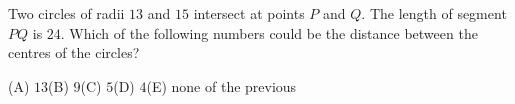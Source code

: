Two circles of radii $13$ and $15$ intersect at points $P$ and $Q$. The length of segment $PQ$ is $24$. Which of the following numbers could be the distance between the centres of the circles?

(A) $13$\quad (B) $9$\quad (C) $5$\quad (D) $4$\quad (E) none of the previous
